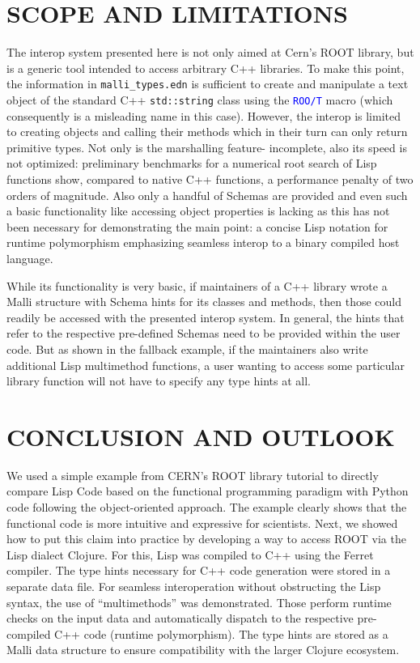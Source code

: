 \documentclass[twocolumn]{article}
\begin{document}
\section{SCOPE AND LIMITATIONS}
The interop system presented here is not only aimed at Cern’s ROOT library, but is a generic tool intended to access arbitrary C++ libraries. To make this point, the information in \texttt{malli\_types.edn} is sufficient to create and manipulate a text object of the standard C++ \texttt{std::string} class using the \texttt{\textcolor{blue}{ROO/T}} macro (which consequently is a misleading name in this case). However, the interop is limited to creating objects and calling their methods which in their turn can only return primitive types. Not only is the marshalling feature- incomplete, also its speed is not optimized: preliminary benchmarks for a numerical root search of Lisp functions show, compared to native C++ functions, a performance penalty of two orders of magnitude. Also only a handful of Schemas are provided and even such a basic functionality like accessing object properties is lacking as this has not been necessary for demonstrating the main point: a concise Lisp notation for runtime polymorphism emphasizing seamless interop to a binary compiled host language.

While its functionality is very basic, if maintainers of a C++ library wrote a Malli structure with Schema hints for its classes and methods, then those could readily be accessed with the presented interop system. In general, the hints that refer to the respective pre-defined Schemas need to be provided within the user code. But as shown in the fallback example, if the maintainers also write additional Lisp multimethod functions, a user wanting to access some particular library function will not have to specify any type hints at all.

\section{CONCLUSION AND OUTLOOK}
We used a simple example from CERN's ROOT library tutorial to directly compare Lisp Code based on the functional programming paradigm with Python code following the object-oriented approach. The example clearly shows that the functional code is more intuitive and expressive for scientists. Next, we showed how to put this claim into practice by developing a way to access ROOT via the Lisp dialect Clojure. For this, Lisp was compiled to C++ using the Ferret compiler. The type hints necessary for C++ code generation were stored in a separate data file. For seamless interoperation without obstructing the Lisp syntax, the use of “multimethods” was demonstrated. Those perform runtime checks on the input data and automatically dispatch to the respective pre-compiled C++ code (runtime polymorphism). The type hints are stored as a Malli data structure to ensure compatibility with the larger Clojure ecosystem.
\end{document}
